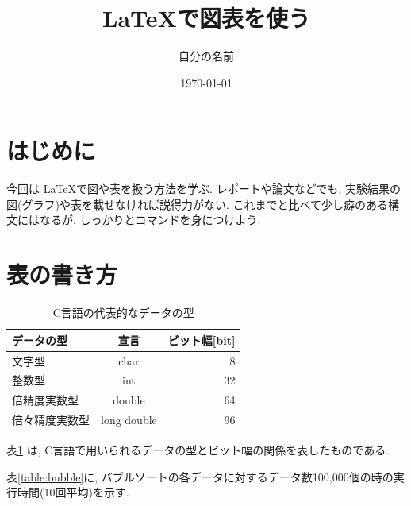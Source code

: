 \documentclass[a4j, titlepage]{jarticle}
\title{\LaTeX で図表を使う}
\date{\today}
\author{自分の名前}
\begin{document}
  \maketitle

  \tableofcontents
  \clearpage


  \section{はじめに}
  今回は \LaTeX で図や表を扱う方法を学ぶ.
  レポートや論文などでも, 実験結果の図(グラフ)や表を載せなければ説得力がない.
  これまでと比べて少し癖のある構文にはなるが, しっかりとコマンドを身につけよう.


  \section{表の書き方}
  
  \begin{table}[htb]
    \caption{C言語の代表的なデータの型}
    \label{table:data_type}
    \begin{center}
      \begin{tabular}{lcr}
        \hline
        データの型  & 宣言  &  ビット幅[bit]  \\
        \hline
        \hline
        文字型  & char  & 8 \\
        整数型  & int   & 32 \\
        倍精度実数型  & double  & 64 \\
        倍々精度実数型  &  long double  &  96 \\
        \hline
      \end{tabular}
    \end{center}
  \end{table}

  表\ref{table:data_type} は, C言語で用いられるデータの型とビット幅の関係を表したものである.

  表\ref{table:bubble}に, バブルソートの各データに対するデータ数100,000個の時の実行時間(10回平均)を示す.
\end{document}
